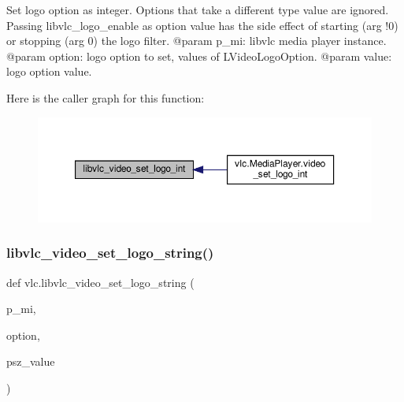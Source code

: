 \begin{DoxyVerb}Set logo option as integer. Options that take a different type value
are ignored.
Passing libvlc_logo_enable as option value has the side effect of
starting (arg !0) or stopping (arg 0) the logo filter.
@param p_mi: libvlc media player instance.
@param option: logo option to set, values of L{VideoLogoOption}.
@param value: logo option value.
\end{DoxyVerb}
 Here is the caller graph for this function\+:
\nopagebreak
\begin{figure}[H]
\begin{center}
\leavevmode
\includegraphics[width=350pt]{namespacevlc_a08e6d3ec08615034c79b7692c3048aa5_icgraph}
\end{center}
\end{figure}
\mbox{\label{namespacevlc_a20561b3917572011df2fb28924f6160c}} 
\subsubsection{\texorpdfstring{libvlc\+\_\+video\+\_\+set\+\_\+logo\+\_\+string()}{libvlc\_video\_set\_logo\_string()}}
{\footnotesize\ttfamily def vlc.\+libvlc\+\_\+video\+\_\+set\+\_\+logo\+\_\+string (\begin{DoxyParamCaption}\item[{}]{p\+\_\+mi,  }\item[{}]{option,  }\item[{}]{psz\+\_\+value }\end{DoxyParamCaption})}

